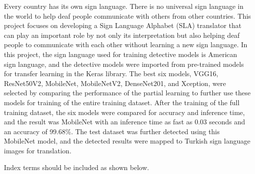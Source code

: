 Every country has its own sign language. There is no universal sign language in the world to help deaf people communicate with others from other countries. This project focuses on developing a Sign Language Alphabet (SLA) translator that can play an important role by not only its interpretation but also helping deaf people to communicate with each other without learning a new sign language. In this project, the sign language used for training detective models is American sign language, and the detective models were imported from pre-trained models for transfer learning in the Keras library. The best six models, VGG16, ResNet50V2, MobileNet, MobileNetV2, DenseNet201, and Xception, were selected by comparing the performance of the partial learning to further use these models for training of the entire training dataset. After the training of the full training dataset, the six models were compared for accuracy and inference time, and the result was MobileNet with an inference time as fast as 0.03 seconds and an accuracy of 99.68\%. The test dataset was further detected using this MobileNet model, and the detected results were mapped to Turkish sign language images for translation.

  Index terms should be included as shown below.